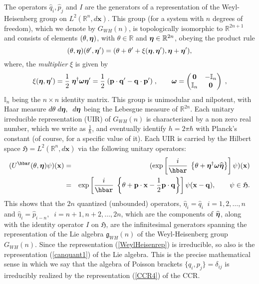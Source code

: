 \documentclass[12pt]{amsart}
\numberwithin{equation}{section}
\theoremstyle{remark}
\newcommand\HH{\mathfrak H}
\newcommand{\be}{\begin{equation}}
\newcommand{\en}{\end{equation}}
\newcommand{\bea}{\begin{eqnarray}}
\newcommand{\ena}{\end{eqnarray}}
\newcommand{\bomega}{\mbox{\boldmath $\omega$}}
\newcommand{\bfeta}{\mbox{\boldmath $\eta$}}
\newcommand{\bp}{\mathbf p}
\newcommand{\bq}{\mathbf q}
\newcommand{\bx}{\mathbf x}
\begin{document}
The operators $\widehat{q}_{i}, \widehat{p}_{j}$ and $I$ are the
generators of a representation of the Weyl-Heisenberg group on
$L^{2}({\mathbb R}^{n}, d\bx)$. This group (for a system with $n$ degrees of
freedom), which we denote by $G_{WH}(n)$, is topologically isomorphic to
${\mathbb R}^{2n+1}$ and consists of elements $(\theta , \bfeta )$, with
$\theta \in \mathbb R$ and $\bfeta \in {\mathbb R}^{2n}$, obeying the product
rule
\be
   (\theta , \bfeta )(\theta' , \bfeta' ) = (\theta + \theta'
   + \xi (\bfeta , \bfeta' ), \bfeta + \bfeta' ),
\label{WeylHeisenprod}
\en
where, the  {\em multiplier} $\xi$ is given by
\be
 \xi(\bfeta , \bfeta' ) = \frac 12\; \bfeta^{\dagger}\bomega\bfeta'
      = \frac 12\; (\bp\cdot\bq' - \bq\cdot\bp' )\; , \qquad
      \bomega = \begin{pmatrix} \mathbf 0 & -\mathbb I_n\\
      \mathbb I_n & \mathbf 0\end{pmatrix}\; ,
\label{multiplier}
\en
${\mathbb I}_n$ being the $n\times n$ identity matrix. This group is unimodular
and  nilpotent, with Haar measure $d\theta \; d{\bfeta}, \;\; d{\bfeta}$ being
the Lebesgue measure of ${\mathbb R}^{2n}$. Each unitary irreducible
representation (UIR) of $G_{WH}(n)$ is characterized by a non zero real number,
which we write as $\displaystyle{\frac 1\hbar}$, and eventually identify
$h = 2\pi\hbar$ with Planck's constant (of course, for a specific value of it).
Each UIR is carried by the Hilbert space $\HH =L^{2}({\mathbb R}^{n}, d\bx )$
via the following unitary operators:
\bea
  (U^{\hbar}(\theta , \bfeta )\psi )(\bx )&  = &
   (\exp \left[\frac i\hbar\;\left\{\theta + {\bfeta}^{\dagger}
  \bomega\widehat{\bfeta}\right\}\right]\psi )(\bx )
   \nonumber\\
     & = & \exp \left[\frac i\hbar\;\left\{\theta + \bp\cdot\bx -\frac 12
      \bp\cdot\bq \right\}\right]\psi (\bx -\bq ), \qquad
  \psi \in \HH .
\label{WeylHeisenrep}
\ena
This shows that the $2n$ quantized (unbounded)
operators, $\widehat{\eta}_i = \widehat{q}_i\;\;
i=1,2, \ldots , n$ and $\widehat{\eta}_i = \widehat{p}_{i-n},\;\;
i=n+1, n+2, \ldots , 2n$, which are the components of $\widehat{\bfeta}$,
along with the identity operator $I$ on $\HH$, are
the infinitesimal generators spanning the representation of the Lie algebra
${\mathfrak g}_{WH}(n)$ of the Weyl-Heisenberg group $G_{WH}(n)$. Since the
representation (\ref{WeylHeisenrep}) is irreducible, so also is the
representation (\ref{canquant1}) of the Lie algebra. This is the precise
mathematical sense in which we say that the algebra of Poisson brackets
$\{q_i, p_{j}\} = \delta_{ij}$ is irreducibly realized by the representation
(\ref{CCR4}) of the CCR.
\end{document}
